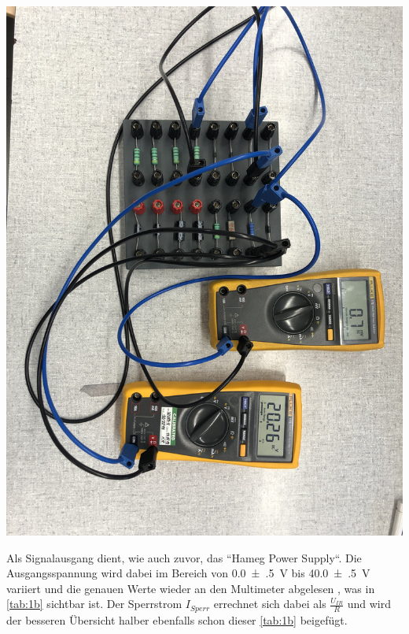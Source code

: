 \documentclass[11pt,ngerman]{scrartcl}
\begin{document}
\begin{center}
	\begin{minipage}[t]{0.7\textwidth}
		\includegraphics[width=\textwidth]{aufbau1b}
		\label{fig:aufbau1b}
	\end{minipage}
\end{center}

Als Signalausgang dient, wie auch zuvor, das ``Hameg Power Supply``. Die Ausgangsspannung wird dabei im Bereich von \SI{0.0(5)}{V} bis \SI{40.0(5)}{V} variiert und die genauen Werte wieder an den Multimeter abgelesen , was in \autoref{tab:1b} sichtbar ist. Der Sperrstrom $I_{Sperr}$ errechnet sich dabei als $\frac{U_{IR}}{R}$ und wird der besseren Übersicht halber ebenfalls schon dieser \autoref{tab:1b} beigefügt.
\end{document}
